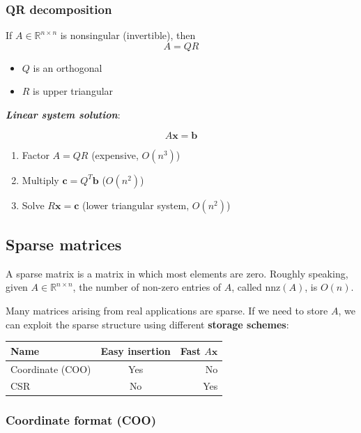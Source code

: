 \subsubsection{QR decomposition}

If $A \in \mathbb{R}^{n \times n}$ is nonsingular (invertible), then
$$
    A = QR
$$
\begin{itemize}
    \item $Q$ is an orthogonal
    \item $R$ is upper triangular
\end{itemize}

\textbf{\textit{Linear system solution}}:

$$A\mathbf{x} = \mathbf{b}$$

\begin{enumerate}
    \item Factor $A = QR$ (expensive, $O(n^{3})$)
    \item Multiply $\mathbf{c} = Q^{T}\mathbf{b}$ ($O(n^{2})$)
    \item Solve $R\mathbf{x} = \mathbf{c}$ (lower triangular system, $O(n^{2})$)
\end{enumerate}

\subsection{Sparse matrices}

A sparse matrix is a matrix in which most elements are zero. Roughly speaking, given $A \in \mathbb{R}^{n\times n}$, the number of non-zero entries of $A$, called $\mathrm{nnz}(A)$, is $O(n)$.

Many matrices arising from real applications are sparse. If we need to store $A$, we can exploit the sparse structure using different \textbf{storage schemes}:

\begin{table}[h!]
    \centering
    \begin{tabular}{|l|c|r|}
        \hline
        Name             & Easy insertion & Fast $A \mathbf{x}$ \\
        \hline
        Coordinate (COO) & Yes            & No                  \\
        CSR              & No             & Yes                 \\
        \hline
    \end{tabular}
\end{table}

\subsubsection{Coordinate format (COO)}

